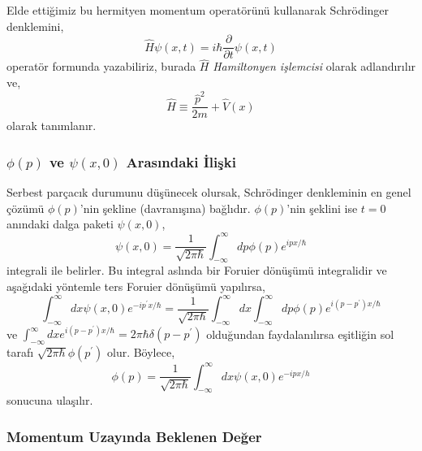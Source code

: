 \documentclass[00_kitap.tex]{subfiles}
\begin{document}
Elde ettiğimiz bu hermityen momentum operatörünü kullanarak Schrödinger denklemini,
\begin{equation}
\hat H\psi(x,t) = i\hbar \dfrac{\partial}{\partial t}\psi(x,t)
\label{eq:schrodinger_operator_form}
\end{equation}
operatör formunda yazabiliriz, burada $\hat H$ \emph{Hamiltonyen işlemcisi} olarak adlandırılır ve,
\begin{equation}
\hat H \equiv \frac{\hat p^2}{2 m} + \hat V(x)
\label{eq:schrodinger_operator_form}
\end{equation}
olarak tanımlanır.


\subsubsection{$\phi\left(p\right)$  ve $\psi\left( x,0\right)$ Arasındaki İlişki}

Serbest parçacık durumunu düşünecek olursak, Schrödinger denkleminin en genel çözümü $\phi(p)$'nin şekline (davranışına) bağlıdır. $\phi(p)$'nin şeklini ise $t=0$ anındaki dalga paketi $\psi(x,0)$,
\begin{equation}
\psi \left( x,0\right) =\dfrac {1}{\sqrt {2\pi \hbar }}\int ^{\infty }_{-\infty }dp\phi \left( p\right) e^{i px /\hbar }
\label{eq:wave_packet_in_t0}
\end{equation}
integrali ile belirler. Bu integral aslında bir Foruier dönüşümü integralidir ve aşağıdaki yöntemle ters Foruier dönüşümü yapılırsa,
\begin{equation}
\int _ { - \infty } ^ { \infty } d x \psi ( x , 0 ) e ^ { - i p ^ { \prime } x / \hbar } = \frac { 1 } { \sqrt { 2 \pi \hbar } } \int _ { - \infty } ^ { \infty } d x \int _ { - \infty } ^ { \infty } d p \phi ( p ) e ^ { i \left( p - p ^ { \prime } \right) x / \hbar }
\label{eq:wave_packet_in_p_t0}
\end{equation}
ve $\int _ { - \infty } ^ { \infty } d x e ^ { i \left( p - p ^ { \prime } \right) x/\hbar } = 2 \pi \hbar \delta \left( p - p ^ { \prime } \right)$ olduğundan faydalanılırsa eşitliğin sol tarafı $\sqrt { 2 \pi  \hbar } \phi \left( p ^ { \prime } \right)$ olur. Böylece,
\begin{equation}
\phi ( p ) = \frac { 1 } { \sqrt { 2 \pi \hbar } } \int _ { - \infty } ^ { \infty } d x \psi ( x , 0 ) e ^ { - i p x/ h }
\end{equation}
sonucuna ulaşılır. 


\subsubsection{Momentum Uzayında Beklenen Değer}
\end{document}
